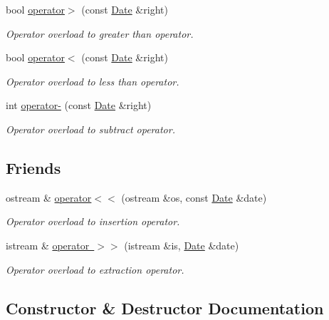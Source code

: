 \begin{DoxyCompactItemize}
bool \mbox{\hyperlink{class_date_ac90afc16b9a3b887c960861643fc0ba1}{operator$>$}} (const \mbox{\hyperlink{class_date}{Date}} \&right)
\begin{DoxyCompactList}\small\item\em Operator overload to greater than operator. \end{DoxyCompactList}\item 
bool \mbox{\hyperlink{class_date_ad7637f53eec6eafb2edcfc76c5ef8696}{operator$<$}} (const \mbox{\hyperlink{class_date}{Date}} \&right)
\begin{DoxyCompactList}\small\item\em Operator overload to less than operator. \end{DoxyCompactList}\item 
int \mbox{\hyperlink{class_date_a45c0bb5dfe6d8bcfc7093b5671ae167a}{operator-\/}} (const \mbox{\hyperlink{class_date}{Date}} \&right)
\begin{DoxyCompactList}\small\item\em Operator overload to subtract operator. \end{DoxyCompactList}\end{DoxyCompactItemize}
\subsection*{Friends}
\begin{DoxyCompactItemize}
\item 
ostream \& \mbox{\hyperlink{class_date_a7396647c65aa5f260ed37f8fc369fe5f}{operator$<$$<$}} (ostream \&os, const \mbox{\hyperlink{class_date}{Date}} \&date)
\begin{DoxyCompactList}\small\item\em Operator overload to insertion operator. \end{DoxyCompactList}\item 
istream \& \mbox{\hyperlink{class_date_ace64caa31aaaf69efcd86f01b5b549c0}{operator $>$$>$}} (istream \&is, \mbox{\hyperlink{class_date}{Date}} \&date)
\begin{DoxyCompactList}\small\item\em Operator overload to extraction operator. \end{DoxyCompactList}\end{DoxyCompactItemize}


\subsection{Constructor \& Destructor Documentation}
\mbox{\label{class_date_a8852e910e80f96d9fbf496f19a1481c5}} 
